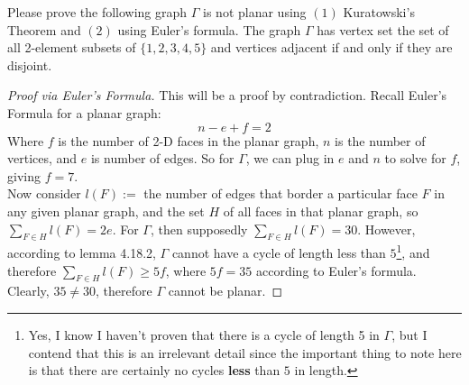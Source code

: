 \documentclass[12pt]{article}
\newenvironment{problem}[2][Problem]{\begin{trivlist}
\item[\hskip \labelsep {\bfseries #1}\hskip \labelsep {\bfseries #2.}]}{\end{trivlist}}
\begin{document}
\begin{problem}{2}
Please prove the following graph $\Gamma$ is not planar using $(1)$ Kuratowski's Theorem and $(2)$ using Euler's formula. The graph $\Gamma$ has vertex set the set of all 2-element subsets of $\{1,2,3,4,5\}$ and vertices adjacent if and only if they are disjoint.
\end{problem}
 
\begin{proof}[Proof via Euler's Formula]
This will be a proof by contradiction. Recall Euler's Formula for a planar graph:
\[n-e+f=2\]\nonumber
Where $f$ is the number of 2-D faces in the planar graph, $n$ is the number of vertices, and $e$ is number of edges. So for $\Gamma$, we can plug in $e$ and $n$ to solve for $f$, giving $f=7$. \\
Now consider $l(F):=$ the number of edges that border a particular face $F$ in any given planar graph, and the set $H$ of all faces in that planar graph, so $\sum_{F \in H}l(F)=2e$. For $\Gamma$, then supposedly $\sum_{F \in H}l(F)=30$. However, according to lemma 4.18.2, $\Gamma$ cannot have a cycle of length less than $5$\footnote{Yes, I know I haven't proven that there is a cycle of length 5 in $\Gamma$, but I contend that this is an irrelevant detail since the important thing to note here is that there are certainly no cycles \textbf{less} than $5$ in length.}, and therefore $\sum_{F \in H}l(F)\geq5f$, where $5f=35$ according to Euler's formula. Clearly, $35 \neq 30$, therefore $\Gamma$ cannot be planar.
\end{proof}
\end{document}
